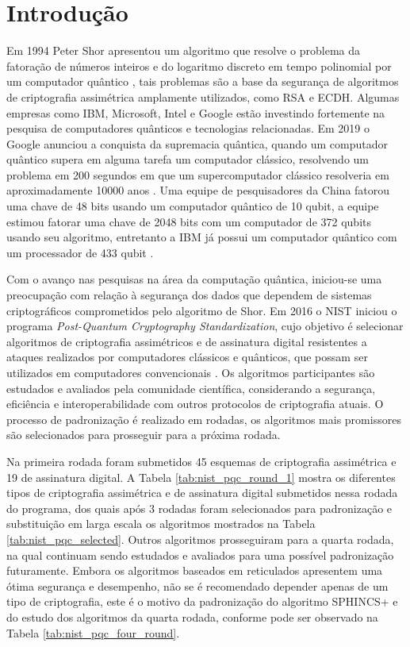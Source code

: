\chapter{Introdução} 
\label{chap:intro}

Em 1994 Peter Shor apresentou um algoritmo que resolve o problema da fatoração de números inteiros e do logaritmo discreto em tempo polinomial por um computador quântico \cite{shor}, tais problemas são a base da segurança de algoritmos de criptografia assimétrica amplamente utilizados, como \ac{RSA} e \ac{ECDH}. Algumas empresas como IBM, Microsoft, Intel e Google estão investindo fortemente na pesquisa de computadores quânticos e tecnologias relacionadas. Em 2019 o Google anunciou a conquista da supremacia quântica, quando um computador quântico supera em alguma tarefa um computador clássico, resolvendo um problema em 200 segundos em que um supercomputador clássico resolveria em aproximadamente 10000 anos \cite{google}. Uma equipe de pesquisadores da China fatorou uma chave de 48 bits usando um computador quântico de 10 qubit, a equipe estimou fatorar uma chave de 2048 bits com um computador de 372 qubits usando seu algoritmo\cite{yan2022factoring}, entretanto a IBM já possui um computador quântico com um processador de 433 qubit \cite{ibm433qubit}.

Com o avanço nas pesquisas na área da computação quântica, iniciou-se uma preocupação com relação à segurança dos dados que dependem de sistemas criptográficos comprometidos pelo algoritmo de Shor. Em 2016 o \ac{NIST} iniciou o programa \textit{Post-Quantum Cryptography Standardization}, cujo objetivo é selecionar algoritmos de criptografia assimétricos e de assinatura digital resistentes a ataques realizados por computadores clássicos e quânticos, que possam ser utilizados em computadores convencionais \cite{nist}. Os algoritmos participantes são estudados e avaliados pela comunidade científica, considerando a segurança, eficiência e interoperabilidade com outros protocolos de criptografia atuais. O processo de padronização é realizado em rodadas, os algoritmos mais promissores são selecionados para prosseguir para a próxima rodada. 

Na primeira rodada foram submetidos 45 esquemas de criptografia assimétrica e 19 de assinatura digital. A Tabela \ref{tab:nist_pqc_round_1} mostra os diferentes tipos de criptografia assimétrica e de assinatura digital submetidos nessa rodada do programa, dos quais após 3 rodadas foram selecionados para padronização e substituição em larga escala os algoritmos mostrados na Tabela \ref{tab:nist_pqc_selected}. Outros algoritmos prosseguiram para a quarta rodada, na qual continuam sendo estudados e avaliados para uma possível padronização futuramente. Embora os algoritmos baseados em reticulados apresentem uma ótima segurança e desempenho, não se é recomendado depender apenas de um tipo de criptografia, este é o motivo da padronização do algoritmo SPHINCS+ e do estudo dos algoritmos da quarta rodada, conforme pode ser observado na Tabela \ref{tab:nist_pqc_four_round}.

